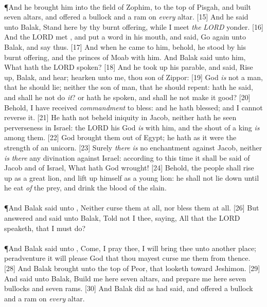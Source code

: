 \\
\P \textcolor[cmyk]{0.99998,1,0,0}{And he brought him into the field of Zophim, to the top of Pisgah, and built seven altars, and offered a bullock and a ram on \emph{every} altar.}
[15] \textcolor[cmyk]{0.99998,1,0,0}{And he said unto Balak, Stand here by thy burnt offering, while I meet \emph{the} \emph{LORD} yonder.}
[16] \textcolor[cmyk]{0.99998,1,0,0}{And the LORD met , and put a word in his mouth, and said, Go again unto Balak, and say thus.}
[17] \textcolor[cmyk]{0.99998,1,0,0}{And when he came to him, behold, he stood by his burnt offering, and the princes of Moab with him. And Balak said unto him, What hath the LORD spoken?}
[18] \textcolor[cmyk]{0.99998,1,0,0}{And he took up his parable, and said, Rise up, Balak, and hear; hearken unto me, thou son of Zippor:}
[19] \textcolor[cmyk]{0.99998,1,0,0}{God \emph{is} not a man, that he should lie; neither the son of man, that he should repent: hath he said, and shall he not do \emph{it}? or hath he spoken, and shall he not make it good?}
[20] \textcolor[cmyk]{0.99998,1,0,0}{Behold, I have received \emph{commandment} to bless: and he hath blessed; and I cannot reverse it.}
[21] \textcolor[cmyk]{0.99998,1,0,0}{He hath not beheld iniquity in Jacob, neither hath he seen perverseness in Israel: the LORD his God \emph{is} with him, and the shout of a king \emph{is} among them.}
[22] \textcolor[cmyk]{0.99998,1,0,0}{God brought them out of Egypt; he hath as it were the strength of an unicorn.}
[23] \textcolor[cmyk]{0.99998,1,0,0}{Surely \emph{there} \emph{is} no enchantment against Jacob, neither \emph{is} \emph{there} any divination against Israel: according to this time it shall be said of Jacob and of Israel, What hath God wrought!}
[24] \textcolor[cmyk]{0.99998,1,0,0}{Behold, the people shall rise up as a great lion, and lift up himself as a young lion: he shall not lie down until he eat \emph{of} the prey, and drink the blood of the slain.}\\
\\
\P \textcolor[cmyk]{0.99998,1,0,0}{And Balak said unto , Neither curse them at all, nor bless them at all.}
[26] \textcolor[cmyk]{0.99998,1,0,0}{But  answered and said unto Balak, Told not I thee, saying, All that the LORD speaketh, that I must do?}\\
\\
\P \textcolor[cmyk]{0.99998,1,0,0}{And Balak said unto , Come, I pray thee, I will bring thee unto another place; peradventure it will please God that thou mayest curse me them from thence.}
[28] \textcolor[cmyk]{0.99998,1,0,0}{And Balak brought  unto the top of Peor, that looketh toward Jeshimon.}
[29] \textcolor[cmyk]{0.99998,1,0,0}{And  said unto Balak, Build me here seven altars, and prepare me here seven bullocks and seven rams.}
[30] \textcolor[cmyk]{0.99998,1,0,0}{And Balak did as  had said, and offered a bullock and a ram on \emph{every} altar.}